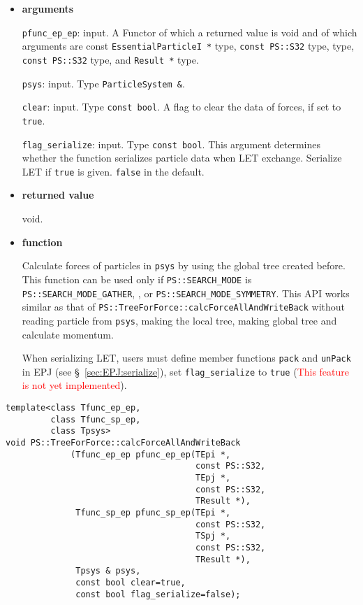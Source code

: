 \begin{itemize}

\item {\bf arguments}

{\tt pfunc\_ep\_ep}: input. A Functor of which a returned value is
void and of which arguments are const {\tt EssentialParticleI *} type, {\tt const PS::S32} type,  type, {\tt const PS::S32} type, and {\tt Result *} type.

{\tt psys}: input. Type {\tt ParticleSystem \&}.

{\tt clear}: input. Type {\tt const bool}. A flag to clear the data of forces, if set to {\tt true}.

\texttt{flag\_serialize}: input. Type \texttt{const bool}. This argument determines whether the function serializes particle data when LET exchange. Serialize LET if \texttt{true} is given. \texttt{false} in the default.

\item {\bf returned value}

void.

\item {\bf function}

Calculate forces of particles in {\tt psys} by using the global tree created before. This function can be used only if {\tt PS::SEARCH\_MODE} is {\tt PS::SEARCH\_MODE\_GATHER}, , or {\tt PS::SEARCH\_MODE\_SYMMETRY}. This API works similar as that of {\tt PS::TreeForForce::calcForceAllAndWriteBack} without reading particle from {\tt psys}, making the local tree, making global tree and calculate momentum.

When serializing LET, users must define member functions \texttt{pack} and \texttt{unPack} in EPJ (see \S~\ref{sec:EPJ:serialize}), set \texttt{flag\_serialize} to \texttt{true} (\textcolor{red}{This feature is not yet implemented}).

\end{itemize}

\begin{screen}
\begin{verbatim}
template<class Tfunc_ep_ep,
         class Tfunc_sp_ep,
         class Tpsys>
void PS::TreeForForce::calcForceAllAndWriteBack
             (Tfunc_ep_ep pfunc_ep_ep(TEpi *,
                                      const PS::S32,
                                      TEpj *,
                                      const PS::S32,
                                      TResult *),
              Tfunc_sp_ep pfunc_sp_ep(TEpi *,
                                      const PS::S32,
                                      TSpj *,
                                      const PS::S32,
                                      TResult *),
              Tpsys & psys,
              const bool clear=true,
              const bool flag_serialize=false);
\end{verbatim}
\end{screen}


